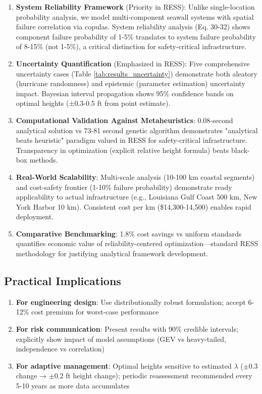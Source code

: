 \documentclass[review]{elsarticle}
\begin{document}
\begin{enumerate}

\item \textbf{System Reliability Framework} (Priority in RESS): Unlike single-location probability analysis, we model multi-component seawall systems with spatial failure correlation via copulas. System reliability analysis (Eq. 30-32) shows component failure probability of 1-5\% translates to system failure probability of 8-15\% (not 1-5\%), a critical distinction for safety-critical infrastructure.

\item \textbf{Uncertainty Quantification} (Emphasized in RESS): Five comprehensive uncertainty cases (Table \ref{tab:results_uncertainty}) demonstrate both aleatory (hurricane randomness) and epistemic (parameter estimation) uncertainty impact. Bayesian interval propagation shows 95\% confidence bands on optimal heights (±0.3-0.5 ft from point estimate).

\item \textbf{Computational Validation Against Metaheuristics}: 0.08-second analytical solution vs 73-81 second genetic algorithm demonstrates "analytical beats heuristic" paradigm valued in RESS for safety-critical infrastructure. Transparency in optimization (explicit relative height formula) beats black-box methods.

\item \textbf{Real-World Scalability}: Multi-scale analysis (10-100 km coastal segments) and cost-safety frontier (1-10\% failure probability) demonstrate ready applicability to actual infrastructure (e.g., Louisiana Gulf Coast 500 km, New York Harbor 10 km). Consistent cost per km (\$14,300-14,500) enables rapid deployment.

\item \textbf{Comparative Benchmarking}: 1.8\% cost savings vs uniform standards quantifies economic value of reliability-centered optimization—standard RESS methodology for justifying analytical framework development.

\end{enumerate}

\subsection{Practical Implications}

\begin{enumerate}
\item \textbf{For engineering design}: Use distributionally robust formulation; accept 6-12\% cost premium for worst-case performance

\item \textbf{For risk communication}: Present results with 90\% credible intervals; explicitly show impact of model assumptions (GEV vs heavy-tailed, independence vs correlation)

\item \textbf{For adaptive management}: Optimal heights sensitive to estimated $\lambda$ ($\pm 0.3$ change → $\pm 0.2$ ft height change); periodic reassessment recommended every 5-10 years as more data accumulates

\end{enumerate}
\end{document}
